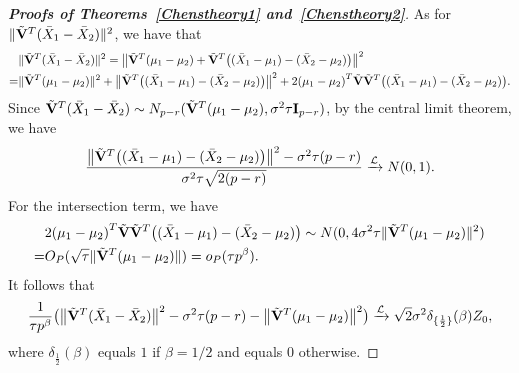 \documentclass[3p]{elsarticle}
\theoremstyle{plain}
\theoremstyle{definition}
\theoremstyle{remark}
\begin{document}
\begin{appendices}
\begin{proof}[\textbf{Proofs of Theorems~\ref{Chenstheory1} and~\ref{Chenstheory2}}]
    As for $\|\tilde{\mathbf{V}}^T(\bar{X}_1-\bar{X}_2)\|^2$, we have that
        $$
        \begin{aligned}
            &\|\tilde{\mathbf{V}}^T(\bar{X}_1-\bar{X}_2)\|^2
            =\big\|\tilde{\mathbf{V}}^T(\mu_1-\mu_2)+\tilde{\mathbf{V}}^T\big((\bar{X}_1-\mu_1)-(\bar{X}_2-\mu_2)\big)\big\|^2\\
            =&\|\tilde{\mathbf{V}}^T(\mu_1-\mu_2)\|^2+
            \big\|\tilde{\mathbf{V}}^T\big((\bar{X}_1-\mu_1)-(\bar{X}_2-\mu_2)\big)\big\|^2+
            2{(\mu_1-\mu_2)}^T\tilde{\mathbf{V}}\tilde{\mathbf{V}}^T\big((\bar{X}_1-\mu_1)-(\bar{X}_2-\mu_2)\big).
        \end{aligned}
        $$
Since $\tilde{\mathbf{V}}^T (\bar{X}_1-\bar{X}_2)\sim N_{p-r}(\tilde{\mathbf{V}}^T (\mu_1-\mu_2),  \sigma^2 \tau \mathbf{I}_{p-r})$, by the central limit theorem, we have
    $$
\frac{
    \big\|\tilde{\mathbf{V}}^T\big((\bar{X}_1-\mu_1)-(\bar{X}_2-\mu_2)\big)\big\|^2-\sigma^2 \tau (p-r)}{\sigma^2 \tau\sqrt{2(p-r)}}\xrightarrow{\mathcal{L}} N(0,1).
    $$
    For the intersection term, we have
    \begin{equation*}
        \begin{aligned}
            &2{(\mu_1-\mu_2)}^T\tilde{\mathbf{V}}\tilde{\mathbf{V}}^T\big((\bar{X}_1-\mu_1)-(\bar{X}_2-\mu_2)\big)
            \sim N(0,4\sigma^2 \tau \|\tilde{\mathbf{V}}^T(\mu_1-\mu_2)\|^2)\\
            =& O_P(\sqrt{\tau}\|\tilde{\mathbf{V}}^T(\mu_1-\mu_2)\| )=o_P(\tau p^{\beta}).
        \end{aligned}
    \end{equation*}
    It follows that
    \begin{equation}\label{eq:kkk3}
\frac{1}{\tau p^\beta}
    \big(\big\|\tilde{\mathbf{V}}^T(\bar{X}_1-\bar{X}_2)\big\|^2-\sigma^2 \tau (p-r)-\big\|\tilde{\mathbf{V}}^T(\mu_1-\mu_2)\big\|^2\big)
    \xrightarrow{\mathcal{L}} 
        \sqrt{2}\sigma^2 \delta_{\{\frac{1}{2}\}}(\beta)Z_0,
    \end{equation}
    where $\delta_{\frac{1}{2}}(\beta)$ equals $1$ if $\beta=1/2$ and equals $0$ otherwise.



\end{proof}
\end{appendices}
\end{document}
